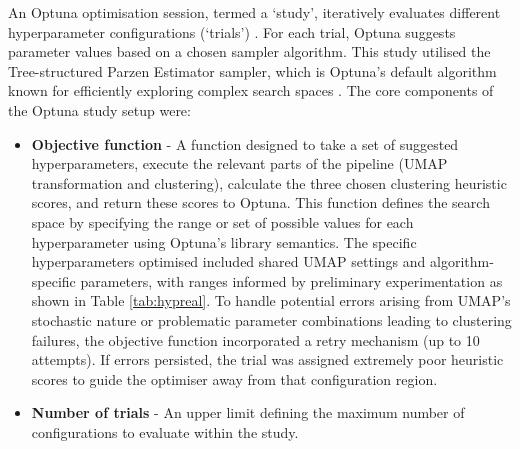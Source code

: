\documentclass[10pt,oneside]{report}
\begin{document}
An Optuna optimisation session, termed a `study', iteratively evaluates different hyperparameter configurations (`trials') \cite{akiba2019optuna}. For each trial, Optuna suggests parameter values based on a chosen sampler algorithm. This study utilised the Tree-structured Parzen Estimator sampler, which is Optuna's default algorithm known for efficiently exploring complex search spaces \cite{watanabe2023tree}. The core components of the Optuna study setup were:   

\begin{itemize}
    \item \textbf{Objective function} - A function designed to take a set of suggested hyperparameters, execute the relevant parts of the pipeline (UMAP transformation and clustering), calculate the three chosen clustering heuristic scores, and return these scores to Optuna. This function defines the search space by specifying the range or set of possible values for each hyperparameter using Optuna's library semantics. The specific hyperparameters optimised included shared UMAP settings and algorithm-specific parameters, with ranges informed by preliminary experimentation as shown in Table \ref{tab:hypreal}. To handle potential errors arising from UMAP's stochastic nature or problematic parameter combinations leading to clustering failures, the objective function incorporated a retry mechanism (up to 10 attempts). If errors persisted, the trial was assigned extremely poor heuristic scores to guide the optimiser away from that configuration region.
    \item \textbf{Number of trials} - An upper limit defining the maximum number of configurations to evaluate within the study.
\end{itemize}
\end{document}
